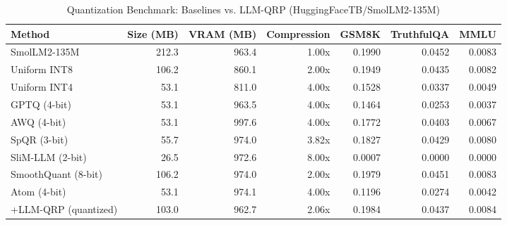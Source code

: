 \begin{table}[htbp]
  \centering
  \small
  \caption{Quantization Benchmark: Baselines vs. LLM-QRP (HuggingFaceTB/SmolLM2-135M)}
  \label{tab:benchmark}
  \begin{tabular}{lrrrrrr}
    \toprule
    \textbf{Method} & \textbf{Size (MB)} & \textbf{VRAM (MB)} & \textbf{Compression} & \textbf{GSM8K} & \textbf{TruthfulQA} & \textbf{MMLU} \\
    \midrule
    SmolLM2-135M & 212.3 & 963.4 & 1.00x & 0.1990 & 0.0452 & 0.0083 \\
    Uniform INT8 & 106.2 & 860.1 & 2.00x & 0.1949 & 0.0435 & 0.0082 \\
    Uniform INT4 & 53.1 & 811.0 & 4.00x & 0.1528 & 0.0337 & 0.0049 \\
    GPTQ (4-bit) & 53.1 & 963.5 & 4.00x & 0.1464 & 0.0253 & 0.0037 \\
    AWQ (4-bit) & 53.1 & 997.6 & 4.00x & 0.1772 & 0.0403 & 0.0067 \\
    SpQR (3-bit) & 55.7 & 974.0 & 3.82x & 0.1827 & 0.0429 & 0.0080 \\
    SliM-LLM (2-bit) & 26.5 & 972.6 & 8.00x & 0.0007 & 0.0000 & 0.0000 \\
    SmoothQuant (8-bit) & 106.2 & 974.0 & 2.00x & 0.1979 & 0.0451 & 0.0083 \\
    Atom (4-bit) & 53.1 & 974.1 & 4.00x & 0.1196 & 0.0274 & 0.0042 \\
    \midrule
    +LLM-QRP (quantized) & 103.0 & 962.7 & 2.06x & 0.1984 & 0.0437 & 0.0084 \\
    \bottomrule
  \end{tabular}
\end{table}
